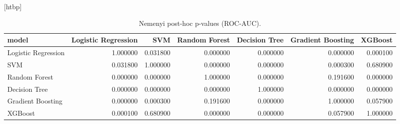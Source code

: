 \begin{table}
\small[htbp]
\caption{Nemenyi post-hoc p-values (ROC-AUC).}
\label{tab:P04b_nemenyi_roc_auc}
\begin{tabular}{lrrrrrr}
\toprule
model & Logistic Regression & SVM & Random Forest & Decision Tree & Gradient Boosting & XGBoost \\
\midrule
Logistic Regression & 1.000000 & 0.031800 & 0.000000 & 0.000000 & 0.000000 & 0.000100 \\
SVM & 0.031800 & 1.000000 & 0.000000 & 0.000000 & 0.000300 & 0.680900 \\
Random Forest & 0.000000 & 0.000000 & 1.000000 & 0.000000 & 0.191600 & 0.000000 \\
Decision Tree & 0.000000 & 0.000000 & 0.000000 & 1.000000 & 0.000000 & 0.000000 \\
Gradient Boosting & 0.000000 & 0.000300 & 0.191600 & 0.000000 & 1.000000 & 0.057900 \\
XGBoost & 0.000100 & 0.680900 & 0.000000 & 0.000000 & 0.057900 & 1.000000 \\
\bottomrule
\end{tabular}
\end{table}
